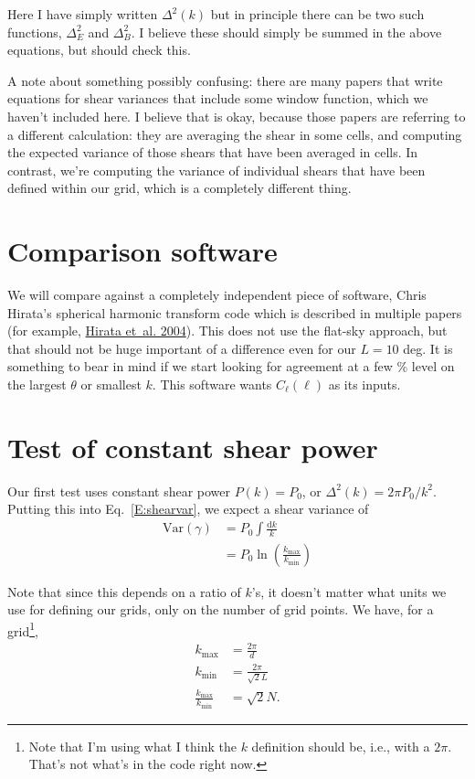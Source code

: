 \documentclass[preprint]{aastex}
\newcommand{\kmax}{\ensuremath{k_\mathrm{max}}}
\newcommand{\kmin}{\ensuremath{k_\mathrm{min}}}
\newcommand{\rmd}{\ensuremath{\mathrm{d}}}
\begin{document}
Here I have simply written $\Delta^2(k)$ but in principle there can be
two such functions, $\Delta^2_{E}$ and $\Delta^2_B$.  I believe these
should simply be summed in the above equations, but should check this.

A note about something possibly confusing: there are many papers that
write equations for shear variances that include some window function,
which we haven't included here.  I believe that is okay, because those
papers are referring to a different calculation: they are averaging
the shear in some cells, and computing the expected variance of those
shears that have been averaged in cells.  In contrast, we're computing
the variance of individual shears that have been defined within our
grid, which is a completely different thing.

\section{Comparison software}

We will compare against a completely independent piece of software,
Chris Hirata's spherical harmonic transform code which is described in
multiple papers (for example,
\href{http://adsabs.harvard.edu/abs/2004PhRvD..70j3501H}{Hirata
  et~al. 2004}).  This does not use the flat-sky
approach, but that should not be huge important of a difference even
for our $L=10$ deg.  It is something to bear in mind if we start
looking for agreement at a few \% level on the largest $\theta$ or
smallest $k$.  This software wants $C_\ell(\ell)$ as its inputs.

\section{Test of constant shear power}

Our first test uses constant shear power $P(k)=P_0$, or
$\Delta^2(k)=2\pi P_0/k^2$.  Putting this into Eq.~\ref{E:shearvar},
we expect a shear variance of
\begin{align}
\mathrm{Var}(\gamma) &= P_0 \int \frac{\rmd k}{k} \\
 &= P_0 \ln{\left(\frac{\kmax}{\kmin}\right)}
\end{align}

Note that since this depends on a ratio of $k$'s, it doesn't matter
what units we use for defining our grids, only on the number of grid
points.  We have, for a grid\footnote{Note that I'm using what I think
  the $k$ definition should be, i.e., with a $2\pi$.  That's not
  what's in the code right now.},
\begin{align}
\kmax &= \frac{2\pi}{d} \\
\kmin &= \frac{2\pi}{\sqrt{2}L}\\
\frac{\kmax}{\kmin} &= \sqrt{2}N.
\end{align}
\end{document}
